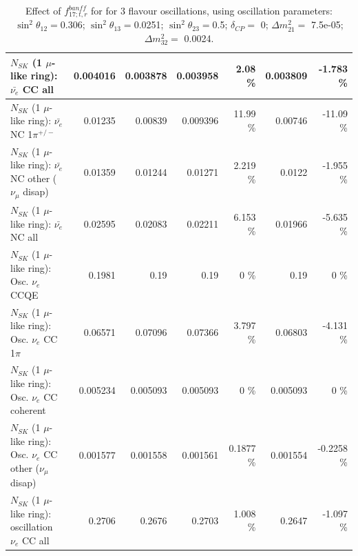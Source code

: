 \begin{table}
\begin{tabular}{| l | r | r | r  r | r  r |}
                            $N_{SK}$ (1 $\mu$-like ring): $\bar{\nu_{e}}$ CC all &        0.004016 &        0.003878 &        0.003958 &     2.08 \%  &        0.003809 &   -1.783 \%  \\ 
\hline
                     $N_{SK}$ (1 $\mu$-like ring): $\bar{\nu_e}$ NC 1$\pi^{+/-}$ &         0.01235 &         0.00839 &        0.009396 &    11.99 \%  &         0.00746 &   -11.09 \%  \\ 
          $N_{SK}$ (1 $\mu$-like ring): $\bar{\nu_e}$ NC other ($\nu_\mu$ disap) &         0.01359 &         0.01244 &         0.01271 &    2.219 \%  &          0.0122 &   -1.955 \%  \\ 
                            $N_{SK}$ (1 $\mu$-like ring): $\bar{\nu_{e}}$ NC all &         0.02595 &         0.02083 &         0.02211 &    6.153 \%  &         0.01966 &   -5.635 \%  \\ 
\hline
\hline
\hline
                                 $N_{SK}$ (1 $\mu$-like ring): Osc. $\nu_e$ CCQE &          0.1981 &            0.19 &            0.19 &        0 \%  &            0.19 &        0 \%  \\ 
                            $N_{SK}$ (1 $\mu$-like ring): Osc. $\nu_e$ CC 1$\pi$ &         0.06571 &         0.07096 &         0.07366 &    3.797 \%  &         0.06803 &   -4.131 \%  \\ 
                          $N_{SK}$ (1 $\mu$-like ring): Osc. $\nu_e$ CC coherent &        0.005234 &        0.005093 &        0.005093 &        0 \%  &        0.005093 &        0 \%  \\ 
           $N_{SK}$ (1 $\mu$-like ring): Osc. $\nu_e$ CC other ($\nu_\mu$ disap) &        0.001577 &        0.001558 &        0.001561 &   0.1877 \%  &        0.001554 &  -0.2258 \%  \\ 
                        $N_{SK}$ (1 $\mu$-like ring): oscillation $\nu_e$ CC all &          0.2706 &          0.2676 &          0.2703 &    1.008 \%  &          0.2647 &   -1.097 \%  \\ 
\hline
\hline
\end{tabular}
\caption{ Effect of $f_{17; t, r}^{banff}$ for for 3 flavour oscillations, using oscillation parameters:  $\sin^2\theta_{12} = $0.306; $\sin^2\theta_{13} = $0.0251; $\sin^2\theta_{23} = $0.5; $\delta_{CP} = $        0; $\Delta m^2_{21} = $    7.5e-05; $\Delta m^2_{32} = $    0.0024. }
\label{tab:num_banff_mares_1RmuT_3f_osc_t13:0.0251}
\end{table}
\clearpage
